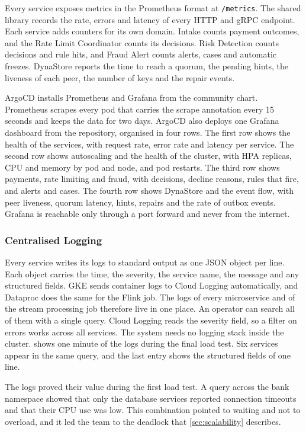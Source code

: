 \documentclass[11pt,a4paper]{article}
\newcommand{\code}[1]{\texttt{#1}}
\begin{document}
Every service exposes metrics in the Prometheus format at \code{/metrics}. The shared library records the rate, errors and latency of every HTTP and gRPC endpoint. Each service adds counters for its own domain. Intake counts payment outcomes, and the Rate Limit Coordinator counts its decisions. Risk Detection counts decisions and rule hits, and Fraud Alert counts alerts, cases and automatic freezes. DynaStore reports the time to reach a quorum, the pending hints, the liveness of each peer, the number of keys and the repair events.

ArgoCD installs Prometheus and Grafana from the community chart. Prometheus scrapes every pod that carries the scrape annotation every 15 seconds and keeps the data for two days. ArgoCD also deploys one Grafana dashboard from the repository, organised in four rows. The first row shows the health of the services, with request rate, error rate and latency per service. The second row shows autoscaling and the health of the cluster, with HPA replicas, CPU and memory by pod and node, and pod restarts. The third row shows payments, rate limiting and fraud, with decisions, decline reasons, rules that fire, and alerts and cases. The fourth row shows DynaStore and the event flow, with peer liveness, quorum latency, hints, repairs and the rate of outbox events. Grafana is reachable only through a port forward and never from the internet.

\subsubsection{Centralised Logging}

Every service writes its logs to standard output as one JSON object per line. Each object carries the time, the severity, the service name, the message and any structured fields. GKE sends container logs to Cloud Logging automatically, and Dataproc does the same for the Flink job. The logs of every microservice and of the stream processing job therefore live in one place. An operator can search all of them with a single query. Cloud Logging reads the severity field, so a filter on errors works across all services. The system needs no logging stack inside the cluster.  shows one minute of the logs during the final load test. Six services appear in the same query, and the last entry shows the structured fields of one line.

The logs proved their value during the first load test. A query across the bank namespace showed that only the database services reported connection timeouts and that their CPU use was low. This combination pointed to waiting and not to overload, and it led the team to the deadlock that \cref{sec:scalability} describes.
\end{document}
